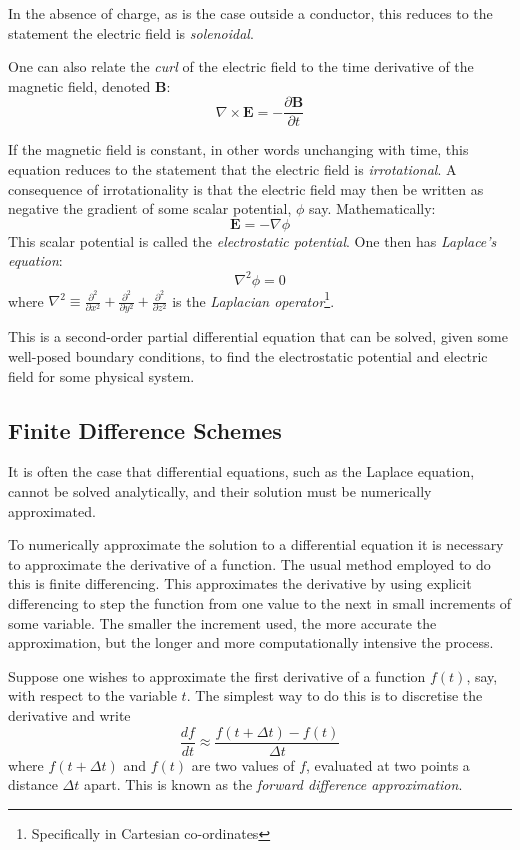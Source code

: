 \documentclass[12pt, a4paper]{article}
\newcommand{\be}{\begin{equation}}
\newcommand{\ee}{\end{equation}}
\begin{document}
In the absence of charge, as is the case outside a conductor, this reduces to the
statement the electric field is \emph{solenoidal}.

One can also relate the \emph{curl} of the electric field to the time
derivative of the magnetic field, denoted \textbf{B}:
%
\be
\nabla \times \bm{E} = - \frac{\partial \bm{B}}{\partial t}
\ee

If the magnetic field is constant, in other words unchanging with time, this equation
reduces to the statement that the electric field is \emph{irrotational}. A
consequence of irrotationality is that the electric field may then be written as
negative the gradient of some scalar potential, $\phi$ say. Mathematically:
%
\be
\bm{E} = -\nabla \phi
\ee
%
This scalar potential is called the \emph{electrostatic potential}.
One then has \emph{Laplace's equation}:
%
\be
\nabla^2 \phi = 0
\ee
%
where
$\nabla^2 \equiv \frac{\partial^2}{\partial x^2}+\frac{\partial^2}{\partial y^2}+\frac{\partial^2}{\partial z^2}$ 
is the \emph{Laplacian operator}\footnote{Specifically in Cartesian co-ordinates}.

This is a second-order partial differential equation that can be solved, given some
well-posed boundary conditions, to find the electrostatic potential and electric field
for some physical system.

\subsection{Finite Difference Schemes}

It is often the case that differential equations, such as the Laplace equation, cannot
be solved analytically, and their solution must be numerically approximated.

To numerically approximate the solution to a differential equation it is
necessary to approximate the derivative of a function. The usual method employed to
do this is finite differencing. This approximates the derivative by using explicit
differencing to step the function from one value to the next in small 
increments of some variable. The smaller the increment used, the more accurate
the approximation, but the longer and more computationally intensive the process.

Suppose one wishes to approximate the first derivative of a function $f(t)$, say,
with respect to the variable $t$. The simplest way to do this is to discretise the
derivative and write
%
\be
\frac{df}{dt} \approx \frac{f(t+\Delta t) - f(t)}{\Delta t}
\ee
%
where $f(t+\Delta t)$ and $f(t)$ are two values of $f$, evaluated at two points
a distance $\Delta t$ apart. This is known as the \emph{forward difference approximation}.
\end{document}
